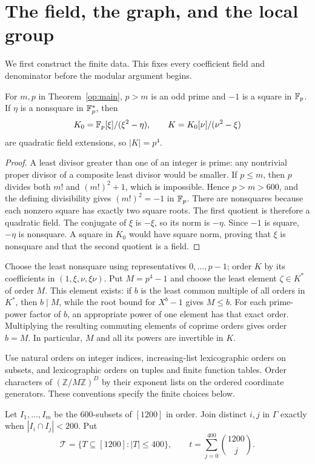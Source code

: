 \section{The field, the graph, and the local group}
\label{op:finite-section}

We first construct the finite data. This fixes every coefficient field
and denominator before the modular argument begins.

\begin{lemma}\label{op:field}
For $m,p$ in Theorem~\ref{op:main}, $p>m$ is an odd prime and $-1$
is a square in $\mathbb F_p$. If $\eta$ is a nonsquare in $\mathbb F_p^*$, then
\[
 K_0=\mathbb F_p[\xi]/(\xi^2-\eta),\qquad
 K=K_0[\nu]/(\nu^2-\xi)
\]
are quadratic field extensions, so $|K|=p^4$.
\end{lemma}
\begin{proof}
A least divisor greater than one of an integer is prime: any nontrivial
proper divisor of a composite least divisor would be smaller. If $p\le m$,
then $p$ divides both $m!$ and $(m!)^2+1$, which is impossible. Hence
$p>m>600$, and the defining divisibility gives $(m!)^2=-1$ in $\mathbb F_p$.
There are nonsquares because each nonzero square has exactly two square
roots. The first quotient is therefore a quadratic field. The conjugate
of $\xi$ is $-\xi$, so its norm is $-\eta$. Since $-1$ is square,
$-\eta$ is nonsquare. A square in $K_0$ would have square norm, proving
that $\xi$ is nonsquare and that the second quotient is a field.
\end{proof}

Choose the least nonsquare using representatives $0,\ldots,p-1$; order
$K$ by its coefficients in $(1,\xi,\nu,\xi\nu)$. Put $M=p^4-1$ and
choose the least element $\zeta\in K^*$ of order $M$. This element
exists: if $b$ is the least common multiple of all orders in $K^*$,
then $b\mid M$, while the root bound for $X^b-1$ gives $M\le b$.
For each prime-power factor of $b$, an appropriate power of one element
has that exact order. Multiplying the resulting commuting elements of
coprime orders gives order $b=M$. In particular, $M$ and all its powers
are invertible in $K$.

Use natural orders on integer indices, increasing-list lexicographic
orders on subsets, and lexicographic orders on tuples and finite function
tables. Order characters of $(\mathbb Z/M\mathbb Z)^D$ by their exponent
lists on the ordered coordinate generators. These conventions specify
the finite choices below.

Let $I_1,\ldots,I_m$ be the $600$-subsets of $[1200]$ in order. Join
distinct $i,j$ in $\Gamma$ exactly when $|I_i\cap I_j|<200$. Put
\[
 \mathcal T=\{T\subseteq[1200]:|T|\le400\},\qquad
 t=\sum_{j=0}^{400}\binom{1200}{j}.
\]

